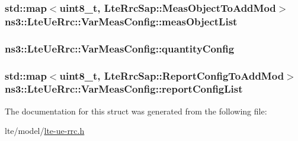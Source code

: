 \subsubsection[{\texorpdfstring{meas\+Object\+List}{measObjectList}}]{\setlength{\rightskip}{0pt plus 5cm}std\+::map$<$uint8\+\_\+t, {\bf Lte\+Rrc\+Sap\+::\+Meas\+Object\+To\+Add\+Mod}$>$ ns3\+::\+Lte\+Ue\+Rrc\+::\+Var\+Meas\+Config\+::meas\+Object\+List}\hypertarget{structns3_1_1LteUeRrc_1_1VarMeasConfig_a79928885aabfe13a4d88e5d31233fac3}{}\label{structns3_1_1LteUeRrc_1_1VarMeasConfig_a79928885aabfe13a4d88e5d31233fac3}
\subsubsection[{\texorpdfstring{quantity\+Config}{quantityConfig}}]{ ns3\+::\+Lte\+Ue\+Rrc\+::\+Var\+Meas\+Config\+::quantity\+Config}\hypertarget{structns3_1_1LteUeRrc_1_1VarMeasConfig_a5e1c86a9be1d9117b9ebca85442ea36e}{}\label{structns3_1_1LteUeRrc_1_1VarMeasConfig_a5e1c86a9be1d9117b9ebca85442ea36e}
\subsubsection[{\texorpdfstring{report\+Config\+List}{reportConfigList}}]{\setlength{\rightskip}{0pt plus 5cm}std\+::map$<$uint8\+\_\+t, {\bf Lte\+Rrc\+Sap\+::\+Report\+Config\+To\+Add\+Mod}$>$ ns3\+::\+Lte\+Ue\+Rrc\+::\+Var\+Meas\+Config\+::report\+Config\+List}\hypertarget{structns3_1_1LteUeRrc_1_1VarMeasConfig_a3ebdd65b8ad3393b5e869599e2a0afff}{}\label{structns3_1_1LteUeRrc_1_1VarMeasConfig_a3ebdd65b8ad3393b5e869599e2a0afff}


The documentation for this struct was generated from the following file\+:\begin{DoxyCompactItemize}
\item 
lte/model/\hyperlink{lte-ue-rrc_8h}{lte-\/ue-\/rrc.\+h}\end{DoxyCompactItemize}
